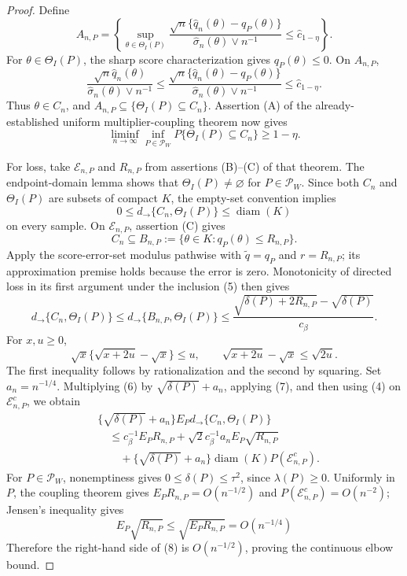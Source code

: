 \documentclass{article}
\begin{document}
\begin{proof}
Define
\[
 A_{n,P}=\left\{
 \sup_{\theta\in\Theta_I(P)}
 \frac{\sqrt n\{\widehat q_n(\theta)-q_P(\theta)\}}
 {\widehat\sigma_n(\theta)\vee n^{-1}}
 \leq\widehat c_{1-\eta}\right\}. \tag{1}
\]
For \(\theta\in\Theta_I(P)\), the sharp score characterization gives \(q_P(\theta)\leq0\). On \(A_{n,P}\),
\[
 \frac{\sqrt n\widehat q_n(\theta)}
 {\widehat\sigma_n(\theta)\vee n^{-1}}
 \leq
 \frac{\sqrt n\{\widehat q_n(\theta)-q_P(\theta)\}}
 {\widehat\sigma_n(\theta)\vee n^{-1}}
 \leq\widehat c_{1-\eta}. \tag{2}
\]
Thus \(\theta\in C_n\), and \(A_{n,P}\subseteq\{\Theta_I(P)\subseteq C_n\}\). Assertion (A) of the already-established uniform multiplier-coupling theorem now gives
\[
 \liminf_{n\to\infty}\inf_{P\in\mathcal P_W}
 P\{\Theta_I(P)\subseteq C_n\}\geq1-\eta. \tag{3}
\]

For loss, take \(\mathcal E_{n,P}\) and \(R_{n,P}\) from assertions (B)--(C) of that theorem. The endpoint-domain lemma shows that \(\Theta_I(P)\neq\varnothing\) for \(P\in\mathcal P_W\). Since both \(C_n\) and \(\Theta_I(P)\) are subsets of compact \(K\), the empty-set convention implies
\[
 0\leq d_{\to}\{C_n,\Theta_I(P)\}\leq\operatorname{diam}(K) \tag{4}
\]
on every sample. On \(\mathcal E_{n,P}\), assertion (C) gives
\[
 C_n\subseteq B_{n,P}:=\{\theta\in K:q_P(\theta)\leq R_{n,P}\}. \tag{5}
\]
Apply the score-error-set modulus pathwise with \(\widetilde q=q_P\) and \(r=R_{n,P}\); its approximation premise holds because the error is zero. Monotonicity of directed loss in its first argument under the inclusion (5) then gives
\[
 d_{\to}\{C_n,\Theta_I(P)\}
 \leq d_{\to}\{B_{n,P},\Theta_I(P)\}
 \leq\frac{\sqrt{\delta(P)+2R_{n,P}}-\sqrt{\delta(P)}}{c_\beta}. \tag{6}
\]
For \(x,u\geq0\),
\[
 \sqrt x\{\sqrt{x+2u}-\sqrt x\}\leq u,
 \qquad
 \sqrt{x+2u}-\sqrt x\leq\sqrt{2u}. \tag{7}
\]
The first inequality follows by rationalization and the second by squaring. Set \(a_n=n^{-1/4}\). Multiplying (6) by \(\sqrt{\delta(P)}+a_n\), applying (7), and then using (4) on \(\mathcal E_{n,P}^c\), we obtain
\[
 \begin{aligned}
 &\{\sqrt{\delta(P)}+a_n\}
 E_Pd_{\to}\{C_n,\Theta_I(P)\}\\
 &\quad\leq c_\beta^{-1}E_PR_{n,P}
 +\sqrt2c_\beta^{-1}a_nE_P\sqrt{R_{n,P}}\\
 &\qquad
 +\{\sqrt{\delta(P)}+a_n\}\operatorname{diam}(K)
 P(\mathcal E_{n,P}^c). \tag{8}
 \end{aligned}
\]
For \(P\in\mathcal P_W\), nonemptiness gives \(0\leq\delta(P)\leq\tau^2\), since \(\lambda(P)\geq0\). Uniformly in \(P\), the coupling theorem gives \(E_PR_{n,P}=O(n^{-1/2})\) and \(P(\mathcal E_{n,P}^c)=O(n^{-2})\); Jensen's inequality gives
\[
 E_P\sqrt{R_{n,P}}\leq\sqrt{E_PR_{n,P}}=O(n^{-1/4})
\]
Therefore the right-hand side of (8) is \(O(n^{-1/2})\), proving the continuous elbow bound.


\end{proof}
\end{document}
